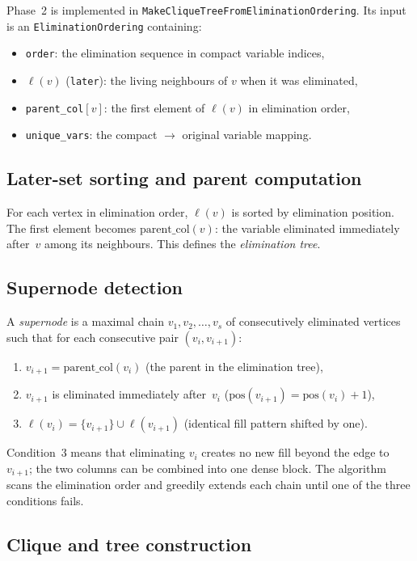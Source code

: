 \documentclass[11pt]{article}
\begin{document}
Phase~2 is implemented in \texttt{MakeCliqueTreeFromEliminationOrdering}.
Its input is an \texttt{EliminationOrdering} containing:
\begin{itemize}
  \item \texttt{order}: the elimination sequence in compact variable
    indices,
  \item $\ell(v)$ (\texttt{later}): the living neighbours of $v$ when
    it was eliminated,
  \item \texttt{parent\_col}$[v]$: the first element of $\ell(v)$ in
    elimination order,
  \item \texttt{unique\_vars}: the compact $\to$ original variable
    mapping.
\end{itemize}

\subsection{Later-set sorting and parent computation}

For each vertex in elimination order, $\ell(v)$ is sorted by elimination
position.  The first element becomes $\mathrm{parent\_col}(v)$: the
variable eliminated immediately after~$v$ among its neighbours.  This
defines the \emph{elimination tree}.

\subsection{Supernode detection}

A \emph{supernode} is a maximal chain
$v_1, v_2, \ldots, v_s$ of consecutively eliminated vertices such that for
each consecutive pair $(v_i, v_{i+1})$:
\begin{enumerate}
  \item $v_{i+1} = \mathrm{parent\_col}(v_i)$ (the parent in the
    elimination tree),
  \item $v_{i+1}$ is eliminated immediately after~$v_i$
    ($\mathrm{pos}(v_{i+1}) = \mathrm{pos}(v_i) + 1$),
  \item $\ell(v_i) = \{v_{i+1}\} \cup \ell(v_{i+1})$ (identical fill
    pattern shifted by one).
\end{enumerate}

Condition~3 means that eliminating $v_i$ creates no new fill beyond the
edge to $v_{i+1}$; the two columns can be combined into one dense
block.  The algorithm scans the elimination order and greedily extends
each chain until one of the three conditions fails.

\subsection{Clique and tree construction}
\end{document}
